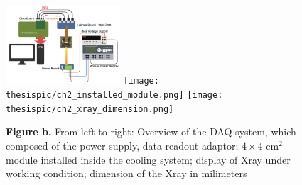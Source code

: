 \documentclass{article}
\begin{document}
\begin{figure}[h]
  \begin{center}
    \includegraphics[width=0.38\textwidth]{thesispic/ch3_DAQ.png}
    \texttt{[image: thesispic/ch2\_installed\_module.png]}
    \texttt{[image: thesispic/ch2\_xray\_dimension.png]}
    \caption*{\textbf{Figure b.} From left to right: Overview of the DAQ system, which composed of 
    the power supply, data readout adaptor; $4\times4$ cm$^2$ module installed
    inside the cooling system; display of Xray under working condition; dimension 
    of the Xray in milimeters}
  \end{center}
\end{figure}

\end{document}
